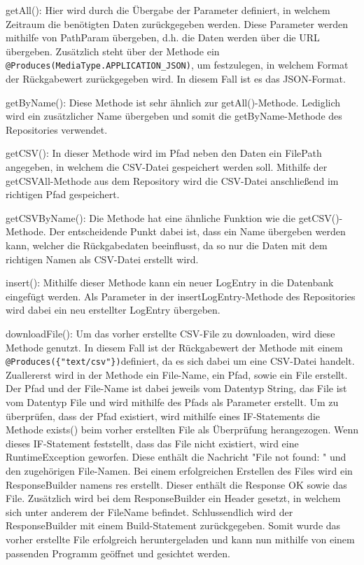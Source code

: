 \begin{compactitem}
    \item getAll(): Hier wird durch die Übergabe der Parameter definiert, in welchem Zeitraum die benötigten Daten zurückgegeben werden. Diese Parameter werden mithilfe von PathParam übergeben, d.h. die Daten werden über die URL übergeben. Zusätzlich steht über der Methode ein \texttt{@Produces(MediaType.APPLICATION\_JSON)}, um festzulegen, in welchem Format der Rückgabewert zurückgegeben wird. In diesem Fall ist es das JSON-Format.
    \item getByName(): Diese Methode ist sehr ähnlich zur getAll()-Methode. Lediglich wird ein zusätzlicher Name übergeben und somit die getByName-Methode des Repositories verwendet.
    \item getCSV(): In dieser Methode wird im Pfad neben den Daten ein FilePath angegeben, in welchem die CSV-Datei gespeichert werden soll. Mithilfe der getCSVAll-Methode aus dem Repository wird die CSV-Datei anschließend im richtigen Pfad gespeichert.
    \item getCSVByName(): Die Methode hat eine ähnliche Funktion wie die getCSV()-Methode. Der entscheidende Punkt dabei ist, dass ein Name übergeben werden kann, welcher die Rückgabedaten beeinflusst, da so nur die Daten mit dem richtigen Namen als CSV-Datei erstellt wird. 
    \item insert(): Mithilfe dieser Methode kann ein neuer LogEntry in die Datenbank eingefügt werden. Als Parameter in der insertLogEntry-Methode des Repositories wird dabei ein neu erstellter LogEntry übergeben.
    \item downloadFile(): Um das vorher erstellte CSV-File zu downloaden, wird diese Methode genutzt. In diesem Fall ist der Rückgabewert der Methode mit einem \texttt{@Produces(\{"text/csv"\})}definiert, da es sich dabei um eine CSV-Datei handelt. Zuallererst wird in der Methode ein File-Name, ein Pfad, sowie ein File erstellt. Der Pfad und der File-Name ist dabei jeweils vom Datentyp String, das File ist vom Datentyp File und wird mithilfe des Pfads als Parameter erstellt. Um zu überprüfen, dass der Pfad existiert, wird mithilfe eines IF-Statements die Methode exists() beim vorher erstellten File als Überprüfung herangezogen. Wenn dieses IF-Statement feststellt, dass das File nicht existiert, wird eine RuntimeException geworfen. Diese enthält die Nachricht "File not found: " und den zugehörigen File-Namen. Bei einem erfolgreichen Erstellen des Files wird ein ResponseBuilder namens res erstellt. Dieser enthält die Response OK sowie das File. Zusätzlich wird bei dem ResponseBuilder ein Header gesetzt, in welchem sich unter anderem der FileName befindet. Schlussendlich wird der ResponseBuilder mit einem Build-Statement zurückgegeben. Somit wurde das vorher erstellte File erfolgreich heruntergeladen und kann nun mithilfe von einem passenden Programm geöffnet und gesichtet werden.
\end{compactitem}
 
